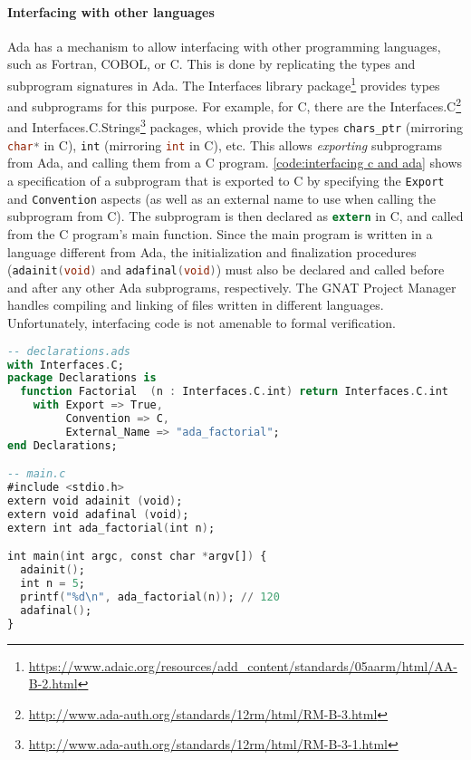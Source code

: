 \paragraph{Interfacing with other languages}
Ada has a mechanism to allow interfacing with other programming languages, such as Fortran, COBOL, or C.
This is done by replicating the types and subprogram signatures in Ada.
The Interfaces library package\footnote{\url{https://www.adaic.org/resources/add_content/standards/05aarm/html/AA-B-2.html}} provides types and subprograms for this purpose.
For example, for C, there are the Interfaces.C\footnote{\url{http://www.ada-auth.org/standards/12rm/html/RM-B-3.html}} and Interfaces.C.Strings\footnote{\url{http://www.ada-auth.org/standards/12rm/html/RM-B-3-1.html}} packages, which provide the types \lstinline[language=Ada]{chars_ptr} (mirroring \lstinline[language=C]{char*} in C), \lstinline[language=Ada]{int} (mirroring \lstinline[language=C]{int} in C), etc.
This allows \textit{exporting} subprograms from Ada, and calling them from a C program.
\autoref{code:interfacing c and ada} shows a specification of a subprogram that is exported to C by specifying the \lstinline[language=Ada]{Export} and \lstinline[language=Ada]{Convention} aspects (as well as an external name to use when calling the subprogram from C).
The subprogram is then declared as \lstinline[language=C]{extern} in C, and called from the C program's main function.
Since the main program is written in a language different from Ada, the initialization and finalization procedures (\lstinline[language=C]{adainit(void)} and \lstinline[language=C]{adafinal(void)}) must also be declared and called before and after any other Ada subprograms, respectively.
The GNAT Project Manager handles compiling and linking of files written in different languages.
Unfortunately, interfacing code is not amenable to formal verification.

\begin{lstlisting}[caption={Interfacing code written in C and Ada. \textnormal{declarations.adb} is omitted for brevity, but is assumed to contain an implementation of the factorial function conforming to the specification.}, label={code:interfacing c and ada}, language=Ada, alsolanguage=C]
-- declarations.ads
with Interfaces.C;
package Declarations is
  function Factorial  (n : Interfaces.C.int) return Interfaces.C.int
    with Export => True,
         Convention => C,
         External_Name => "ada_factorial";
end Declarations;

-- main.c
#include <stdio.h>
extern void adainit (void);
extern void adafinal (void);
extern int ada_factorial(int n);

int main(int argc, const char *argv[]) {
  adainit();
  int n = 5;
  printf("%d\n", ada_factorial(n)); // 120
  adafinal();
}
\end{lstlisting}

